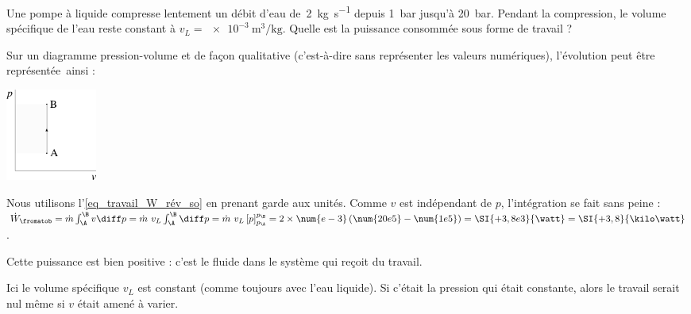 		\begin{anexample}
			Une pompe à liquide compresse lentement un débit d’eau de~\SI{2}{\kilogram\per\second} depuis \SI{1}{\bar} jusqu’à \SI{20}{\bar}. Pendant la compression, le volume spécifique de l’eau reste constant à $v_L = \SI{e-3}{\metre\cubed\per\kilogram}$. Quelle est la puissance consommée sous forme de travail ?
				\begin{answer}
					Sur un diagramme pression-volume et de façon qualitative (c’est-à-dire sans représenter les valeurs numériques), l’évolution peut être représentée~ainsi :
							\begin{center}
								\includegraphics[width=3cm]{images/exe_pv_isochore_so.png}
							\end{center}
					Nous utilisons l’\cref{eq_travail_W_rév_so} en prenant garde aux unités. Comme $v$ est indépendant de $p$, l’intégration se fait sans peine : $\dot{W}_\fromatob 	= \dot{m} \int_\A^\B v \diff p = \dot{m} \ v_L \int_\A^\B \diff p = \dot{m} \ v_L \left[p\right]_{p_\A}^{p_\B} = 2 \times \num{e-3} \left(\num{20e5} - \num{1e5}\right) = \SI{+3,8e3}{\watt} = \SI{+3,8}{\kilo\watt}$.
				\end{answer}
					\begin{remark}Cette puissance est bien positive : c’est le fluide dans le système qui reçoit du travail.\end{remark}
					\begin{remark}Ici le volume spécifique $v_L$ est constant (comme toujours avec l’eau liquide). Si c’était la pression qui était constante, alors le travail serait nul même si $v$ était amené à varier.\end{remark}
		\end{anexample}
		
